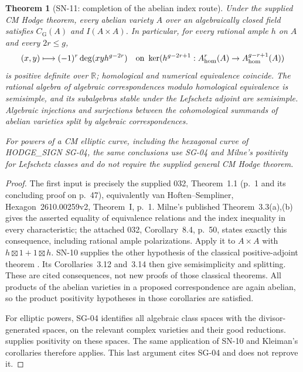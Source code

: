\documentclass[11pt,a4paper]{article}
\newtheorem{theorem}{Theorem}[section]
\theoremstyle{definition}
\theoremstyle{remark}
\begin{document}
\begin{theorem}[SN-11: completion of the abelian index route]
Under the supplied CM Hodge theorem, every abelian variety $A$ over an
algebraically closed field satisfies $C_{\mathrm G}(A)$ and $I(A\times A)$.
In particular, for every rational ample $h$ on $A$ and every $2r\leq g$,
\[
 (x,y)\longmapsto (-1)^r\deg(xy h^{g-2r})
 \quad\text{on }\ker(h^{g-2r+1}:A^r_{\rm hom}(A)\to A^{g-r+1}_{\rm hom}(A))
\]
is positive definite over $\mathbb R$; homological and numerical
equivalence coincide.  The rational algebra of algebraic correspondences
modulo homological equivalence is semisimple, and its subalgebras stable
under the Lefschetz adjoint are semisimple.  Algebraic injections and
surjections between the cohomological summands of abelian varieties split
by algebraic correspondences.

For powers of a CM elliptic curve, including the hexagonal curve of
HODGE\_SIGN SG-04, the same conclusions use SG-04 and Milne's positivity
for Lefschetz classes and do not require the supplied general CM Hodge
theorem.
\end{theorem}
\begin{proof}
The first input is precisely the supplied 032, Theorem~1.1 (p.~1 and its
concluding proof on p.~47), equivalently van Hoften--Sempliner,
Hexagon~2610.00259v2, Theorem~I, p.~1.  Milne's published
Theorem~3.3(a),(b) gives the asserted equality of equivalence relations and
the index inequality in every characteristic; the attached 032,
Corollary~8.4, p.~50, states exactly this consequence, including rational
ample polarizations.  Apply it to $A\times A$ with $h\boxtimes1+1\boxtimes h$.
SN-10 supplies the other hypothesis of the classical positive-adjoint
theorem \cite[Theorem~3.11]{Kleiman1968}.  Its Corollaries~3.12 and~3.14
then give semisimplicity and splitting.  These are cited consequences,
not new proofs of those classical theorems.  All products of the abelian
varieties in a proposed correspondence are again abelian, so the product
positivity hypotheses in those corollaries are satisfied.

For elliptic powers, SG-04 identifies all algebraic class spaces with the
divisor-generated spaces, on the relevant complex varieties and their
good reductions.  \cite[Remarks~3.7--3.8]{Milne2002} supplies positivity on
these spaces.  The same application of SN-10 and Kleiman's corollaries
therefore applies.  This last argument cites SG-04 and does not reprove it.
\end{proof}
\end{document}
